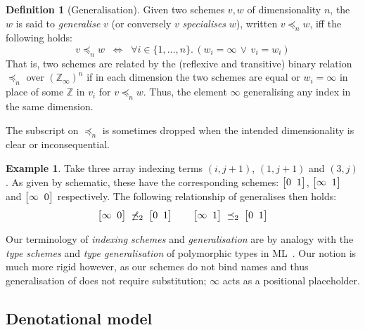 \documentclass[9pt]{sigplanconf}
\newcounter{block}
\theoremstyle{definition}
\newtheorem{example}[block]{Example}
\newtheorem{definition}[block]{Definition}
\newcommand{\vtwoh}[2]{\setlength{\arraycolsep}{0em}
\left[\begin{array}{cc}#1 \; & \; #2\end{array}\right]}
\begin{document}
\begin{definition}[Generalisation]
Given two schemes $v, w$ of dimensionality $n$,
the $w$ is said to \emph{generalise} $v$ 
(or conversely $v$ \emph{specialises} $w$),
written $v \preceq_n w$, iff the following holds:
\[
v \preceq_n w \;\; \Leftrightarrow  \;\;
  \forall i\!\in\!\{ 1, \ldots, n \} . \, (w_i = \infty \, \vee \, v_i = w_i)
\]
That is, two schemes are related by the (reflexive and transitive) binary relation
$\preceq_n$ over $(\mathbb{Z}_{\infty})^n$ if in each dimension
the two schemes are equal or $w_i = \infty$ 
in place of some $\mathbb{Z}$ in $v_i$ for $v \preceq_n w$. 
Thus, the element $\infty$ 
generalising any index in the same dimension. 

The subscript on $\preceq_n$ is sometimes dropped when the
intended dimensionality is clear or inconsequential.
\end{definition}
 
 

\begin{example}
Take three array indexing terms
$(i, j+1)$, $(1, j+1)$ and $(3, j)$.
As given by \textsf{schematic}, these have the 
corresponding schemes: $\vtwoh{0}{1}$, $\vtwoh{\infty}{1}$
and $\vtwoh{\infty}{0}$ respectively. The following
relationship of generalises then holds:
\begin{equation*}
\vtwoh{\infty}{0} \; \not\preceq_2 \; \vtwoh{0}{1} 
\qquad
\vtwoh{\infty}{1} \; \preceq_2 \; \vtwoh{0}{1} 
\end{equation*}
\end{example}
\noindent
Our terminology of \emph{indexing schemes} and
\emph{generalisation} are by analogy
with the \emph{type schemes} and \emph{type generalisation} of
polymorphic types in ML~\cite{milner1978theory}. Our notion is
much more rigid however, as our schemes do not bind names
and thus generalisation of does not require substitution; $\infty$ acts
as a positional placeholder.


\subsection{Denotational model}
\end{document}
